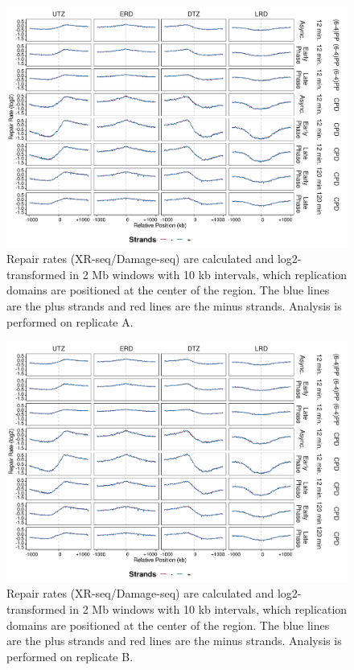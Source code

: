 \begin{figure}[H]
\begin{center}
\includegraphics[width=\textwidth]{Chapters/7_appendix/figures/supfig22}
\caption[Repair rates of replication domains in 2 Mb (replicate A).]{Repair rates (XR-seq/Damage-seq) are calculated and log2-transformed in 2 Mb windows with 10 kb intervals, which replication domains are positioned at the center of the region. The blue lines are the plus strands and red lines are the minus strands. Analysis is performed on replicate A.}
\label{supfig:repairrate2000repdomainA}
\end{center}
\end{figure}

\begin{figure}[H]
\begin{center}
\includegraphics[width=\textwidth]{Chapters/7_appendix/figures/supfig23}
\caption[Repair rates of replication domains in 2 Mb (replicate B).]{Repair rates (XR-seq/Damage-seq) are calculated and log2-transformed in 2 Mb windows with 10 kb intervals, which replication domains are positioned at the center of the region. The blue lines are the plus strands and red lines are the minus strands. Analysis is performed on replicate B.}
\label{supfig:repairrate2000repdomainB}
\end{center}
\end{figure}

